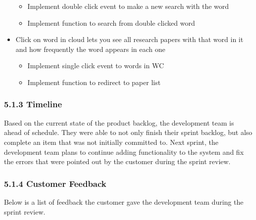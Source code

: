 \documentclass[]{article}
\begin{document}
\begin{itemize}
  \begin{itemize}
  \itemsep1pt\parskip0pt
  \item
    Implement double click event to make a new search with the word
  \item
    Implement function to search from double clicked word
  \end{itemize}
\item
  Click on word in cloud lets you see all research papers with that word
  in it and how frequently the word appears in each one

  \begin{itemize}
  \itemsep1pt\parskip0pt
  \item
    Implement single click event to words in WC
  \item
    Implement function to redirect to paper list
  \end{itemize}
\end{itemize}

\subsubsection{5.1.3 Timeline}\label{timeline}

Based on the current state of the product backlog, the development team
is ahead of schedule. They were able to not only finish their sprint
backlog, but also complete an item that was not initially committed to.
Next sprint, the development team plans to continue adding functionality
to the system and fix the errors that were pointed out by the customer
during the sprint review.

\subsubsection{5.1.4 Customer Feedback}\label{customer-feedback}

Below is a list of feedback the customer gave the development team
during the sprint review.
\end{document}
